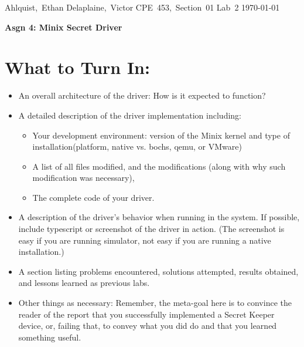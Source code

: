 \documentclass[11pt]{article}
\begin{document}
 \hfill\vbox{\hbox{Ahlquist, Ethan} \hbox{Delaplaine, Victor} \hbox{CPE 453, Section 01}
\hbox{Lab 2}	\hbox{\today}}\bigskip

   \centerline{\Large\bf Asgn 4: Minix Secret Driver}

\section{What to Turn In: }

\begin{adjustwidth}{.2in}{}{
\titlerule

      \begin{itemize}

         \item An overall architecture of the driver: How is it expected to
         function?\\  
      

         \item A detailed description of the driver implementation including:\\

            \begin{itemize}

               \item Your development environment: version of the Minix kernel
                  and type of installation(platform, native vs. bochs, qemu, or
                  VMware)\\

               \item A list of all files modified, and the modifications (along
                  with why such modification was necessary),\\

               \item The complete code of your driver.\\

            \end{itemize}

         \item A description of the driver’s behavior when running in the
            system.  If possible, include typescript or screenshot of the
            driver in action. (The screenshot is easy if you are running
            simulator, not easy if you are running a native installation.)\\

         \item A section listing problems encountered, solutions attempted,
            results obtained, and lessons learned as previous labs.\\

         \item Other things as necessary: Remember, the meta-goal here is to
            convince the reader of the report that you successfully implemented
            a Secret Keeper device, or, failing that, to convey what you did do
            and that you learned something useful.\\

      \end{itemize} 
}\end{adjustwidth}
\end{document}
